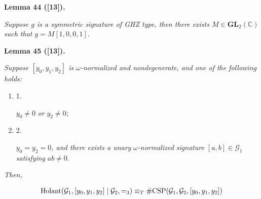 

\par\medskip\noindent\textbf{
\textbf{Lemma 44}\textbf{ }([13])\textbf{.}
}\par



\emph{Suppose $g$ is a symmetric signature of GHZ type, then there exists $M\in\mathbf{GL}_{2}(\mathbb{C})$ such that $g=M[1,0,0,1]$.}\par







\par\medskip\noindent\textbf{
\textbf{Lemma 45}\textbf{ }([13])\textbf{.}
}\par



\emph{Suppose $[y_{0},y_{1},y_{2}]$ is $\omega$-normalized and nondegenerate, and one of the following holds:}\par


\begin{enumerate}


\item[] 
1. 


$y_{0}\neq 0$\emph{ or }$y_{2}\neq 0$\emph{;}\par





\item[] 
2. 


$y_{0}=y_{2}=0$\emph{, and there exists a unary }$\omega$\emph{-normalized signature }$[a,b]\in\mathcal{G}_{1}$\emph{ satisfying }$ab\neq 0$\emph{.}\par





\end{enumerate}




\emph{Then,}\par


\[\begin{gathered}
\textup{{Holant}}(\mathcal{G}_{1},[y_{0},y_{1},y_{2}]\mid\mathcal{G}_{2},=_{3})\equiv_{T}\textup{{\#CSP}}(\mathcal{G}_{1},\mathcal{G}_{2},[y_{0},y_{1},y_{2}])
\end{gathered}\]






